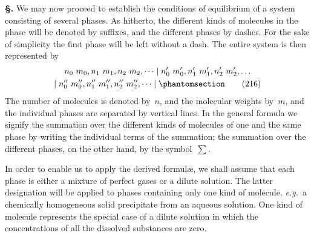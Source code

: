 \documentclass[12pt]{book}[2005/09/16]
\newcommand{\Erratum}[2]{#2}
\newcommand{\Section}[1]{
  \medskip\par\textbf{§\;#1}
  \label{section:#1}
}
\newcommand{\Tag}[1]{%
  \phantomsection\label{eqn:#1}\tag*{\ensuremath{#1}}%
}
\newcommand{\eg}{\emph{e.g.}}
\newcommand{\tsum}{\mathop{\textstyle\sum}\limits}
\begin{document}
\Section{255.} We may now proceed to establish the conditions
of equilibrium of a system consisting of several phases. As
hitherto, the different kinds of molecules in the phase will
be denoted by suffixes, and the different phases by dashes.
For the sake of simplicity the first phase will be left without
a dash. The entire system is then represented by
\begin{gather*}
n_{0}\ m_{0}, n_{1}\ m_{1}, n_{2}\ m_{2}, \dots \mid
n_{0}'\ m_{0}', n_{1}'\ m_{1}', n_{2}'\ m_{2}', \dots \\
\mid n_{0}''\ m_{0}'', n_{1}''\ m_{1}'', n_{2}''\ m_{2}'', \dots \mid
\Tag{(216)}
\end{gather*}
The number of molecules \Erratum{are}{is} denoted by~$n$, and the
molecular weights by~$m$, and the individual phases are
separated by vertical lines. In the general formula we
signify the summation over the different kinds of molecules
of one and the same phase by writing the individual terms
of the summation; the summation over the different phases,
on the other hand, by the symbol~$\tsum$.

In order to enable us to apply the derived formulæ, we
shall assume that each phase is either a mixture of perfect
gases or a dilute solution. The latter designation will be
applied to phases containing only one kind of molecule, \eg\
a chemically homogeneous solid precipitate from an aqueous
solution. One kind of molecule represents the special case
of a dilute solution in which the concentrations of all the
dissolved substances are zero.
\end{document}
